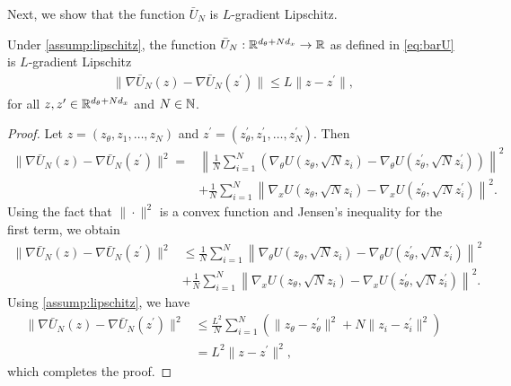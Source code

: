 Next, we show that the function $\bar{U}_N$ is $L$-gradient Lipschitz.
\begin{lemma}\label{lem:gradientlipschitz_barU}
Under \ref{assump:lipschitz}, the function $\bar{U}_N: {\mathbb R}^{d_\theta + Nd_x} \to {\mathbb R}$ as defined in \eqref{eq:barU} is $L$-gradient Lipschitz
\begin{align*}
    \|\nabla \bar{U}_N(z) - \nabla \bar{U}_N(z^\prime)\| \leq L \|z-z^\prime\|,
\end{align*}
for all $z, z^\prime \in {\mathbb R}^{d_\theta + Nd_x}$ and $N \in {\mathbb N}$.
\end{lemma}
\begin{proof}
Let $z = (z_\theta, z_1, \ldots, z_N)$ and $z^\prime = (z_\theta^\prime, z_1^\prime, \ldots, z_N^\prime)$. Then
\begin{align*}
\|\nabla \bar{U}_N(z) - \nabla \bar{U}_N(z^\prime)\|^2 = & \left\| \frac{1}{N} \sum_{i=1}^N  \left(\nabla_\theta U(z_\theta, \sqrt{N}z_i) - \nabla_\theta U(z_\theta^\prime, \sqrt{N}z_i^\prime)\right)\right\|^2 \\
&+ \frac{1}{N} \sum_{i=1}^N \left\|\nabla_x U(z_\theta, \sqrt{N}z_i) - \nabla_x U(z_\theta^\prime, \sqrt{N}z_i^\prime)\right\|^2.
\end{align*}
Using the fact that $\|\cdot\|^2$ is a convex function and Jensen's inequality for the first term, we obtain
\begin{align*}
\|\nabla \bar{U}_N(z) - \nabla \bar{U}_N(z^\prime)\|^2 &\leq\frac{1}{N} \sum_{i=1}^N \left\|\nabla_\theta U(z_\theta, \sqrt{N}z_i) - \nabla_\theta U(z_\theta^\prime, \sqrt{N}z_i^\prime)\right\|^2\\
& + \frac{1}{N} \sum_{i=1}^N \left\|\nabla_x U(z_\theta, \sqrt{N}z_i) - \nabla_x U(z_\theta^\prime, \sqrt{N}z_i^\prime)\right\|^2.
\end{align*}
Using \ref{assump:lipschitz}, we have
\begin{align*}
\|\nabla \bar{U}_N(z) - \nabla \bar{U}_N(z^\prime)\|^2 &\leq\frac{L^2}{N} \sum_{i=1}^N \left(\|z_\theta - z_\theta^\prime\|^2 + N \|z_i - z_i^\prime\|^2\right)\\
&= L^2 \|z - z^\prime\|^2,
\end{align*}
which completes the proof.
\end{proof}


\setcounter{theorem}{0}
\renewcommand{\thetheorem}{B.\arabic{theorem}}
\setcounter{lemma}{0}
\renewcommand{\thelemma}{B.\arabic{lemma}}
\setcounter{proposition}{0}
\renewcommand{\theproposition}{B.\arabic{proposition}}
\setcounter{remark}{0}
\renewcommand{\theremark}{B.\arabic{remark}}

